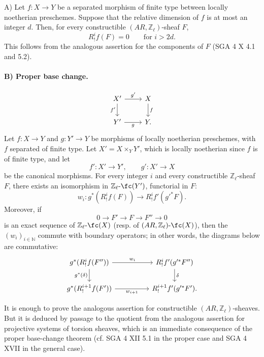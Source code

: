 A) Let \(f:X\to Y\) be a separated morphism of finite type between locally noetherian preschemes. Suppose that the relative dimension of \(f\) is at most an integer \(d\). Then, for every constructible \((AR,\mathbb Z_\ell)\)-sheaf \(F\),
\[
R^i_!f(F)=0\qquad\text{for }i>2d.
\]
This follows from the analogous assertion for the components of \(F\) (SGA 4 X 4.1 and 5.2).

\paragraph{B) Proper base change.}
\[
\begin{tikzcd}
X' \arrow[r,"g'"] \arrow[d,"f'"'] & X \arrow[d,"f"]\\
Y' \arrow[r,"g"'] & Y .
\end{tikzcd}
\]
Let \(f:X\to Y\) and \(g:Y'\to Y\) be morphisms of locally noetherian preschemes, with \(f\) separated of finite type. Let \(X'=X\times_Y Y'\), which is locally noetherian since \(f\) is of finite type, and let
\[
f':X'\to Y',\qquad g':X'\to X
\]
be the canonical morphisms. For every integer \(i\) and every constructible \(\mathbb Z_\ell\)-sheaf \(F\), there exists an isomorphism in \(\mathbb Z_\ell\text{-}\fc(Y')\), functorial in \(F\):
\[
w_i:g^*(R^i_!f(F))\longrightarrow R^i_!f'(g'^*F).
\]
Moreover, if
\[
0\longrightarrow F'\longrightarrow F\longrightarrow F''\longrightarrow 0
\]
is an exact sequence of \(\mathbb Z_\ell\text{-}\fc(X)\) (resp. of \((AR,\mathbb Z_\ell)\text{-}\fc(X)\)), then the \((w_i)_{i\in\mathbb N}\) commute with boundary operators; in other words, the diagrams below are commutative:
\[
\begin{tikzcd}[column sep=huge]
g^*(R^i_!f(F'')) \arrow[r,"w_i"] \arrow[d,"g^*(\delta)"']
&
R^i_!f'(g'^*F'') \arrow[d,"\delta"]\\
g^*(R^{i+1}_!f(F')) \arrow[r,"w_{i+1}"']
&
R^{i+1}_!f'(g'^*F').
\end{tikzcd}
\]

\begin{prooftext}[Proof]
It is enough to prove the analogous assertion for constructible \((AR,\mathbb Z_\ell)\)-sheaves. But it is deduced by passage to the quotient from the analogous assertion for projective systems of torsion sheaves, which is an immediate consequence of the proper base-change theorem (cf. SGA 4 XII 5.1 in the proper case and SGA 4 XVII in the general case).
\end{prooftext}

